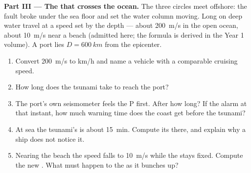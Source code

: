 \begin{problem}
\medskip
\noindent\textbf{Part III --- The  that crosses the ocean.}
The three circles meet offshore: the fault broke under the sea floor
and set the water column moving. Long  on deep water travel at a
speed set by the depth --- about \qty{200}{m/s} in the open ocean,
about \qty{10}{m/s} near a beach (admitted here; the formula is
derived in the Year 1 volume). A port lies $D = \qty{600}{km}$ from
the epicenter.
\begin{enumerate}[resume]
  \item Convert \qty{200}{m/s} to \unit{km/h} and name a vehicle with
        a comparable cruising speed.
  \item How long does the tsunami take to reach the port?
  \item The port's own seismometer feels the P  first. After how
        long? If the alarm  at that instant, how much warning
        time does the coast get before the tsunami?
  \item At sea the tsunami's  is about \qty{15}{min}. Compute its
         there, and explain why a ship does not notice it.
  \item Nearing the beach the speed falls to \qty{10}{m/s} while the
         stays fixed. Compute the new . What must
        happen to the  as it bunches up?
\end{enumerate}


\end{problem}
